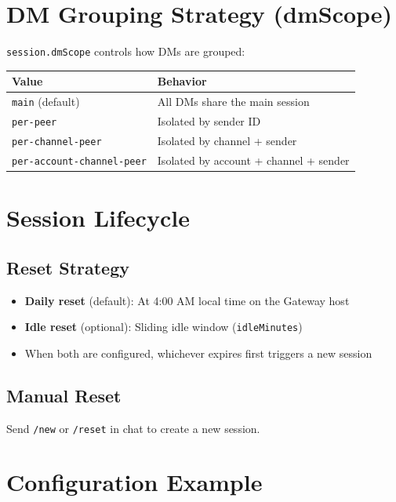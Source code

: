 \section{DM Grouping Strategy (dmScope)}

\texttt{session.dmScope} controls how DMs are grouped:

\begin{center}
\begin{tabular}{ll}
\toprule
\textbf{Value} & \textbf{Behavior} \\
\midrule
\texttt{main} (default) & All DMs share the main session \\
\texttt{per-peer} & Isolated by sender ID \\
\texttt{per-channel-peer} & Isolated by channel + sender \\
\texttt{per-account-channel-peer} & Isolated by account + channel + sender \\
\bottomrule
\end{tabular}
\end{center}

\section{Session Lifecycle}

\subsection{Reset Strategy}

\begin{itemize}
  \item \textbf{Daily reset} (default): At 4:00 AM local time on the Gateway host
  \item \textbf{Idle reset} (optional): Sliding idle window (\texttt{idleMinutes})
  \item When both are configured, whichever expires first triggers a new session
\end{itemize}

\subsection{Manual Reset}

Send \texttt{/new} or \texttt{/reset} in chat to create a new session.

\section{Configuration Example}


